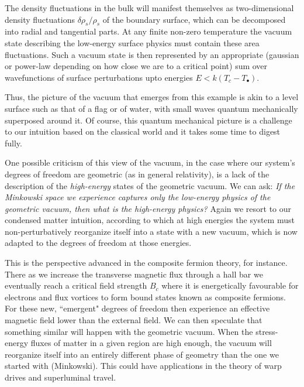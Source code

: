 \begin{doublespace}
The density fluctuations in the bulk will manifest themselves as two-dimensional density fluctuations $ \delta \rho_s/\rho_s $ of the boundary surface, which can be decomposed into radial and tangential parts. At any finite non-zero temperature the vacuum state describing the low-energy surface physics must contain these area fluctuations. Such a vacuum state is then represented by an appropriate (gaussian or power-law depending on how close we are to a critical point) sum over wavefunctions of surface perturbations upto energies $ E < k (T_c - T_\bullet) $.

Thus, the picture of the vacuum that emerges from this example is akin to a level surface such as that of a flag or of water, with small waves quantum mechanically superposed around it. Of course, this quantum mechanical picture is a challenge to our intuition based on the classical world and it takes some time to digest fully.

One possible criticism of this view of the vacuum, in the case where our system's degrees of freedom are geometric (as in general relativity), is a lack of the description of the \emph{high-energy} states of the geometric vacuum. We can ask: \emph{If the Minkowski space we experience captures only the low-energy physics of the geometric vacuum, then what is the high-energy physics?} Again we resort to our condensed matter intuition, according to which at high energies the system must non-perturbatively reorganize itself into a state with a new vacuum, which is now adapted to the degrees of freedom at those energies.

This is the perspective advanced in the composite fermion theory, for instance. There as we increase the transverse magnetic flux through a hall bar we eventually reach a critical field strength $ B_c $ where it is energetically favourable for electrons and flux vortices to form bound states known as composite fermions. For these new, ``emergent" degrees of freedom then experience an effective magnetic field lower than the external field. We can then speculate that something similar will happen with the geometric vacuum. When the stress-energy fluxes of matter in a given region are high enough, the vacuum will reorganize itself into an entirely different phase of geometry than the one we started with (Minkowski). This could have applications in the theory of warp drives and superluminal travel\cite{Alcubierre2000The-warp,Visser1996Lorentzian}.



\end{doublespace}
